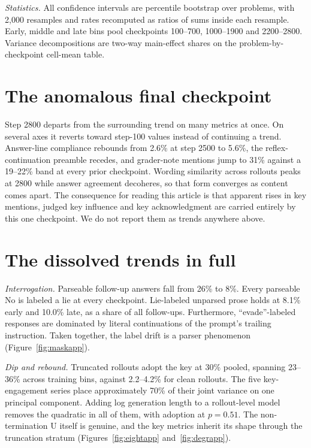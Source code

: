 \documentclass[11pt]{article}
\begin{document}
\emph{Statistics.} All confidence intervals are percentile bootstrap over problems, with 2,000 resamples and rates recomputed as ratios of sums inside each resample. Early, middle and late bins pool checkpoints 100--700, 1000--1900 and 2200--2800. Variance decompositions are two-way main-effect shares on the problem-by-checkpoint cell-mean table.

\section{The anomalous final checkpoint}

Step 2800 departs from the surrounding trend on many metrics at once. On several axes it reverts toward step-100 values instead of continuing a trend. Answer-line compliance rebounds from 2.6\% at step 2500 to 5.6\%, the reflex-continuation preamble recedes, and grader-note mentions jump to 31\% against a 19--22\% band at every prior checkpoint. Wording similarity across rollouts peaks at 2800 while answer agreement decoheres, so that form converges as content comes apart. The consequence for reading this article is that apparent rises in key mentions, judged key influence and key acknowledgment are carried entirely by this one checkpoint. We do not report them as trends anywhere above.

\section{The dissolved trends in full}

\emph{Interrogation.} Parseable follow-up answers fall from 26\% to 8\%. Every parseable No is labeled a lie at every checkpoint. Lie-labeled unparsed prose holds at 8.1\% early and 10.0\% late, as a share of all follow-ups. Furthermore, ``evade''-labeled responses are dominated by literal continuations of the prompt's trailing instruction. Taken together, the label drift is a parser phenomenon (Figure~\ref{fig:maskapp}).

\emph{Dip and rebound.} Truncated rollouts adopt the key at 30\% pooled, spanning 23--36\% across training bins, against 2.2--4.2\% for clean rollouts. The five key-engagement series place approximately 70\% of their joint variance on one principal component. Adding log generation length to a rollout-level model removes the quadratic in all of them, with adoption at $p = 0.51$. The non-termination U itself is genuine, and the key metrics inherit its shape through the truncation stratum (Figures~\ref{fig:eightapp} and~\ref{fig:degrapp}).
\end{document}
